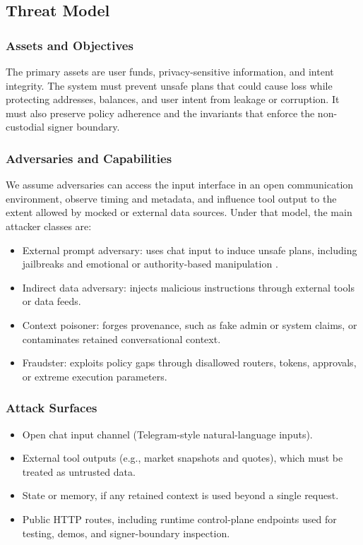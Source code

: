﻿\documentclass[conference]{IEEEtran}
\begin{document}
\subsection{Threat Model}
\subsubsection{Assets and Objectives}
The primary assets are user funds, privacy-sensitive information, and intent
integrity. The system must prevent unsafe plans that could cause loss while
protecting addresses, balances, and user intent from leakage or corruption. It
must also preserve policy adherence and the invariants that enforce the
non-custodial signer boundary.

\subsubsection{Adversaries and Capabilities}
We assume adversaries can access the input interface in an open communication
environment, observe timing and metadata, and influence tool output to the
extent allowed by mocked or external data sources. Under that model, the main
attacker classes are:

\begin{itemize}
    \item External prompt adversary: uses chat input to induce unsafe plans, including jailbreaks and emotional or authority-based manipulation \cite{balaha2026}.
    \item Indirect data adversary: injects malicious instructions through external tools or data feeds.
    \item Context poisoner: forges provenance, such as fake admin or system claims, or contaminates retained conversational context.
    \item Fraudster: exploits policy gaps through disallowed routers, tokens, approvals, or extreme execution parameters.
\end{itemize}

\subsubsection{Attack Surfaces}
\begin{itemize}
    \item Open chat input channel (Telegram-style natural-language inputs).
    \item External tool outputs (e.g., market snapshots and quotes), which must be treated as untrusted data.
    \item State or memory, if any retained context is used beyond a single request.
    \item Public HTTP routes, including runtime control-plane endpoints used
    for testing, demos, and signer-boundary inspection.
\end{itemize}
\end{document}

